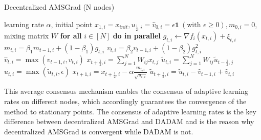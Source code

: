 \documentclass[11pt]{article}
\begin{document}
\begin{algorithm}[t]
	\caption{Decentralized AMSGrad (N nodes)}
	\label{alg: damsgrad}
	\begin{algorithmic}[1]
		 learning rate $\alpha$, initial point $x_{1,i} = x_{init}, u_{\frac{1}{2},i} = \hat v_{0,i} = \epsilon \mathbf 1\ (\text{with } \epsilon \geq 0), m_{0,i}=0$, mixing matrix $W$ 
		\STATE \textbf{for all }$i \in [N]$ \textbf{do in parallel}
		\STATE \quad $g_{t,i}  \leftarrow \nabla f_i(x_{t,i}) + \xi_{t,i}$
		\STATE \quad $m_{t,i} = \beta_1 m_{t-1,i} + (1-\beta_1) g_{t,i}$ 
		\STATE \quad  $ v_{t,i} = \beta_2 v_{t-1,i} + (1-\beta_2) g_{t,i}^2 $
		\STATE  \quad $\hat v_{t,i} = \max (\hat v_{t-1,i}, v_{t,i} )$
		\STATE \quad $x_{t+\frac{1}{2},i} = \sum_{j=1}^N W_{ij}x_{t,j}$
		\STATE \quad $\tilde u_{t,i} = \sum_{j=1}^N W_{ij}\tilde u_{t-\frac{1}{2},j}$
	    \STATE \quad $u_{t,i} = \max(\tilde u_{t,i}, \epsilon)$
		\STATE \quad $x_{t+1,i} = x_{t+\frac{1}{2},i} - \alpha \frac{m_{t,i}}{\sqrt{u_{t,i}}}$
		\STATE \quad $\tilde u_{t+\frac{1}{2},i} = \tilde u_{t,i} - \hat v_{t-1,i} + \hat v_{t,i}$
		\ENDFOR
	\end{algorithmic}
\end{algorithm}


This average consensus mechanism enables the consensus of adaptive learning rates on different nodes, which accordingly guarantees the convergence of the method to stationary points. 
The consensus of adaptive learning rates is the key difference between decentralized AMSGrad and DADAM and is the reason why decentralized AMSGrad is  convergent while DADAM is not.

\end{document}
